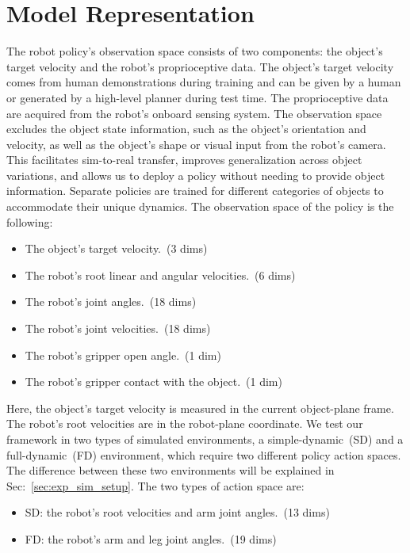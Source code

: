 
\section{Model Representation}


The robot policy's observation space consists of two components: the object's target velocity and the robot's proprioceptive data. The object's target velocity comes from human demonstrations during training and can be given by a human or generated by a high-level planner during test time. 
The proprioceptive data are acquired from the robot's onboard sensing system. The observation space excludes the object state information, such as the object's orientation and velocity, as well as the object's shape or visual input from the robot's camera. This facilitates sim-to-real transfer, improves generalization across object variations, and allows us to deploy a policy without needing to provide object information. 
Separate policies are trained for different categories of objects to accommodate their unique dynamics. The observation space of the policy is the following:
\begin{itemize}
    \item The object's target velocity.~(3 dims)
    \item The robot's root linear and angular velocities.~(6 dims)
    \item The robot's joint angles.~(18 dims)
    \item The robot's joint velocities.~(18 dims)
    \item The robot's gripper open angle.~(1 dim)
    \item The robot's gripper contact with the object.~(1 dim)
\end{itemize}
Here, the object's target velocity is measured in the current object-plane frame. The robot's root velocities are in the robot-plane coordinate. We test our framework in two types of simulated environments, a simple-dynamic~(SD) and a full-dynamic~(FD) environment, which require two different policy action spaces. The difference between these two environments will be explained in Sec:~\ref{sec:exp_sim_setup}. The two types of action space are:
\begin{itemize}
    \item SD: the robot's root velocities and arm joint angles.~(13 dims)
    \item FD: the robot's arm and leg joint angles.~(19 dims)
\end{itemize}

